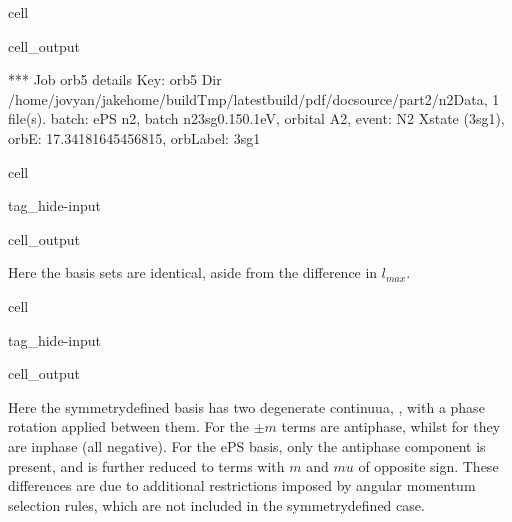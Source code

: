 \documentclass[letterpaper,table,10pt,english]{jupyterBook}
\begin{document}
\begin{sphinxuseclass}{cell}
\begin{sphinxVerbatimOutput}
\begin{sphinxuseclass}{cell_output}
\begin{sphinxVerbatim}[commandchars=\\\{\}]
*** Job orb5 details
Key: orb5
Dir /home/jovyan/jake\PYGZhy{}home/buildTmp/\PYGZus{}latest\PYGZus{}build/pdf/doc\PYGZhy{}source/part2/n2Data, 1 file(s).
\PYGZob{}   \PYGZsq{}batch\PYGZsq{}: \PYGZsq{}ePS n2, batch n2\PYGZus{}3sg\PYGZus{}0.1\PYGZhy{}50.1eV, orbital A2\PYGZsq{},
    \PYGZsq{}event\PYGZsq{}: \PYGZsq{} N2 X\PYGZhy{}state (3sg\PYGZhy{}1)\PYGZsq{},
    \PYGZsq{}orbE\PYGZsq{}: \PYGZhy{}17.34181645456815,
    \PYGZsq{}orbLabel\PYGZsq{}: \PYGZsq{}3sg\PYGZhy{}1\PYGZsq{}\PYGZcb{}
\end{sphinxVerbatim}

\end{sphinxuseclass}\end{sphinxVerbatimOutput}

\end{sphinxuseclass}
\begin{sphinxuseclass}{cell}
\begin{sphinxuseclass}{tag_hide-input}\begin{sphinxVerbatimOutput}

\begin{sphinxuseclass}{cell_output}
\end{sphinxuseclass}\end{sphinxVerbatimOutput}

\end{sphinxuseclass}
\end{sphinxuseclass}
\sphinxAtStartPar
Here the basis sets are identical, aside from the difference in \(l_{max}\).

\begin{sphinxuseclass}{cell}
\begin{sphinxuseclass}{tag_hide-input}\begin{sphinxVerbatimOutput}

\begin{sphinxuseclass}{cell_output}
\end{sphinxuseclass}\end{sphinxVerbatimOutput}

\end{sphinxuseclass}
\end{sphinxuseclass}
\sphinxAtStartPar
Here the symmetry\sphinxhyphen{}defined basis has two degenerate continuua, , with a phase rotation applied between them. For  the \(\pm m\) terms are anti\sphinxhyphen{}phase, whilst for  they are in\sphinxhyphen{}phase (all negative). For the ePS basis, only the anti\sphinxhyphen{}phase component is present, and is further reduced to terms with \(m\) and \(mu\) of opposite sign. These differences are due to additional restrictions imposed by angular momentum selection rules, which are not included in the symmetry\sphinxhyphen{}defined case.
\end{document}
